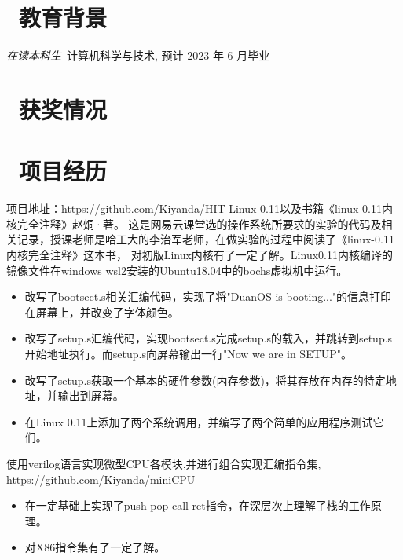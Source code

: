 \documentclass{resume}
\begin{document}
\normalsize{%

\section{\faGraduationCap\ 教育背景}
\textit{在读本科生}\ 计算机科学与技术, 预计 2023 年 6 月毕业

\section{\faHeartO\ 获奖情况}

\section{\faUsers\ 项目经历}
项目地址：https://github.com/Kiyanda/HIT-Linux-0.11以及书籍《linux-0.11内核完全注释》赵烔·著。
这是网易云课堂选的操作系统所要求的实验的代码及相关记录，授课老师是哈工大的李治军老师，在做实验的过程中阅读了《linux-0.11内核完全注释》这本书，
对初版Linux内核有了一定了解。Linux0.11内核编译的镜像文件在windows wsl2安装的Ubuntu18.04中的bochs虚拟机中运行。
\begin{itemize}
  \item 改写了bootsect.s相关汇编代码，实现了将"DuanOS is booting..."的信息打印在屏幕上，并改变了字体颜色。
  \item 改写了setup.s汇编代码，实现bootsect.s完成setup.s的载入，并跳转到setup.s开始地址执行。而setup.s向屏幕输出一行"Now we are in SETUP"。
  \item 改写了setup.s获取一个基本的硬件参数(内存参数)，将其存放在内存的特定地址，并输出到屏幕。
  \item 在Linux 0.11上添加了两个系统调用，并编写了两个简单的应用程序测试它们。
\end{itemize}

使用verilog语言实现微型CPU各模块,并进行组合实现汇编指令集, https://github.com/Kiyanda/miniCPU
\begin{itemize}
  \item 在一定基础上实现了push pop call ret指令，在深层次上理解了栈的工作原理。
  \item 对X86指令集有了一定了解。
\end{itemize}

}
\end{document}
